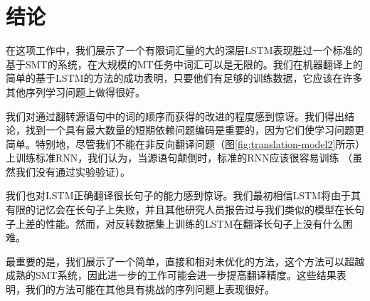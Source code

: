 \section{结论}

在这项工作中，我们展示了一个有限词汇量的大的深层LSTM表现胜过一个标准的基于SMT的系统，在大规模的MT任务中词汇可以是无限的。我们在机器翻译上的简单的基于LSTM的方法的成功表明，只要他们有足够的训练数据，它应该在许多其他序列学习问题上做得很好。

我们对通过翻转源语句中的词的顺序而获得的改进的程度感到惊讶。我们得出结论，找到一个具有最大数量的短期依赖问题编码是重要的，因为它们使学习问题更简单。特别地，尽管我们不能在非反向翻译问题（图\ref{fig:translation-model2}所示）上训练标准RNN，我们认为，当源语句颠倒时，标准的RNN应该很容易训练
（虽然我们没有通过实验验证）。

我们也对LSTM正确翻译很长句子的能力感到惊讶。我们最初相信LSTM将由于其有限的记忆会在长句子上失败，并且其他研究人员报告过与我们类似的模型在长句子上差的性能\cite{cho14,bog14,curse}。然而，对反转数据集上训练的LSTM在翻译长句子上没有什么困难。

最重要的是，我们展示了一个简单，直接和相对未优化的方法，这个方法可以超越成熟的SMT系统，因此进一步的工作可能会进一步提高翻译精度。这些结果表明，我们的方法可能在其他具有挑战的序列问题上表现很好。
